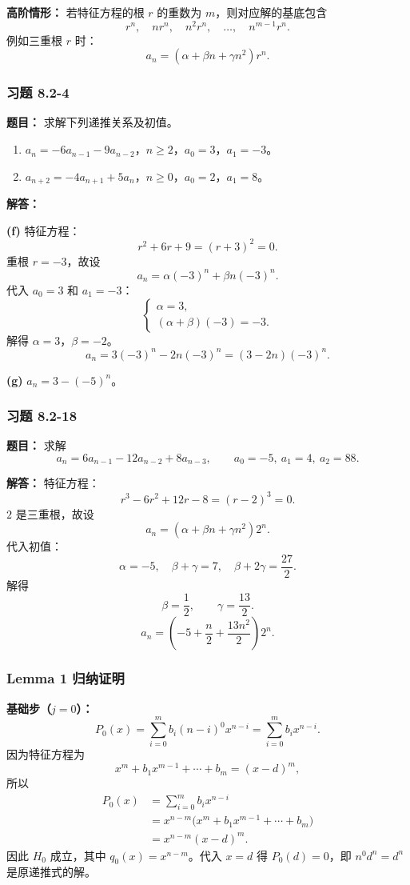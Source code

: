 \documentclass[11pt,UTF8]{article}
\begin{document}
\textbf{高阶情形：} 若特征方程的根 $r$ 的重数为 $m$，则对应解的基底包含
\[ r^n,\quad nr^n,\quad n^2r^n,\quad\ldots,\quad n^{m-1}r^n. \]
例如三重根 $r$ 时：
\[ a_n = (\alpha+\beta n+\gamma n^2)r^n. \]

\subsubsection*{习题 8.2-4}
\textbf{题目：} 求解下列递推关系及初值。
\begin{enumerate}
    \item[(f)] $a_n=-6a_{n-1}-9a_{n-2}$，$n\ge 2$，$a_0=3$，$a_1=-3$。
    \item[(g)] $a_{n+2}=-4a_{n+1}+5a_n$，$n\ge 0$，$a_0=2$，$a_1=8$。
\end{enumerate}

\textbf{解答：}

\textbf{(f)} 特征方程：
\[ r^2+6r+9=(r+3)^2=0. \]
重根 $r=-3$，故设
\[ a_n=\alpha(-3)^n+\beta n(-3)^n. \]
代入 $a_0=3$ 和 $a_1=-3$：
\[ \begin{cases}
\alpha = 3,\\
(\alpha+\beta)(-3)=-3.
\end{cases} \]
解得 $\alpha=3$，$\beta=-2$。
\[ \boxed{a_n=3(-3)^n-2n(-3)^n=(3-2n)(-3)^n.} \]

\textbf{(g)} $\boxed{a_n=3-(-5)^n}$。

\subsubsection*{习题 8.2-18}
\textbf{题目：} 求解
\[ a_n=6a_{n-1}-12a_{n-2}+8a_{n-3},\qquad a_0=-5,\ a_1=4,\ a_2=88. \]

\textbf{解答：} 特征方程：
\[ r^3-6r^2+12r-8=(r-2)^3=0. \]
$2$ 是三重根，故设
\[ a_n=(\alpha+\beta n+\gamma n^2)2^n. \]
代入初值：
\[ \alpha=-5,\quad \beta+\gamma=7,\quad \beta+2\gamma=\frac{27}{2}. \]
解得
\[ \beta=\frac{1}{2},\qquad \gamma=\frac{13}{2}. \]
\[ \boxed{a_n=\left(-5+\frac{n}{2}+\frac{13n^2}{2}\right)2^n.} \]

\subsubsection*{Lemma 1 归纳证明}

\textbf{基础步（$j=0$）：}
\[ P_0(x)=\sum_{i=0}^{m}b_i(n-i)^0x^{n-i}=\sum_{i=0}^{m}b_ix^{n-i}. \]
因为特征方程为
\[ x^m+b_1x^{m-1}+\cdots+b_m=(x-d)^m, \]
所以
\begin{align*}
P_0(x) &= \sum_{i=0}^{m}b_ix^{n-i} \\
&= x^{n-m}\bigl(x^m+b_1x^{m-1}+\cdots+b_m\bigr) \\
&= x^{n-m}(x-d)^m.
\end{align*}
因此 $H_0$ 成立，其中 $q_0(x)=x^{n-m}$。代入 $x=d$ 得 $P_0(d)=0$，即 $n^0d^n=d^n$ 是原递推式的解。
\end{document}
